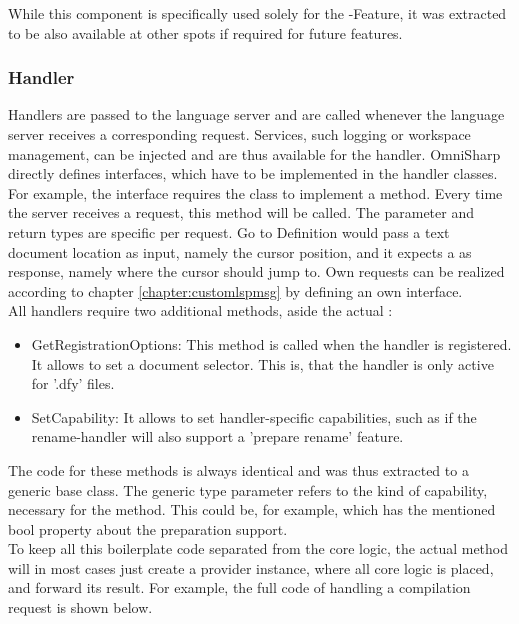 While this component is specifically used solely for the -Feature, it was extracted to be also available at other spots if required for future features.

\subsubsection{Handler}
Handlers are passed to the language server and are called whenever the language server receives a corresponding request.
Services, such logging or workspace management, can be injected and are thus available for the handler.
OmniSharp directly defines interfaces, which have to be implemented in the handler classes.
For example, the interface  requires the class to implement a  method.
Every time the server receives a  request, this  method will be called.
The parameter and return types are specific per request.
Go to Definition would pass a text document location as input, namely the cursor position, and it expects a  as response, namely where the cursor should jump to.
Own requests can be realized according to chapter \ref{chapter:customlspmsg} by defining an own interface.\\

All handlers require two additional methods, aside the actual :
\begin{itemize}
    \item GetRegistrationOptions: This method is called when the handler is registered.
    It allows to set a document selector.
    This is, that the handler is only active for '.dfy' files.
    \item SetCapability: It allows to set handler-specific capabilities, such as if the rename-handler will also support a 'prepare rename' feature.
\end{itemize}
The code for these methods is always identical and was thus extracted to a generic base class.
The generic type parameter refers to the kind of capability, necessary for the  method.
This could be, for example,  which has the mentioned bool property about the preparation support.\\

To keep all this boilerplate code separated from the core logic, the actual  method will in most cases just create a provider instance, where all core logic is placed, and forward its result.
For example, the full code of handling a compilation request is shown below.

